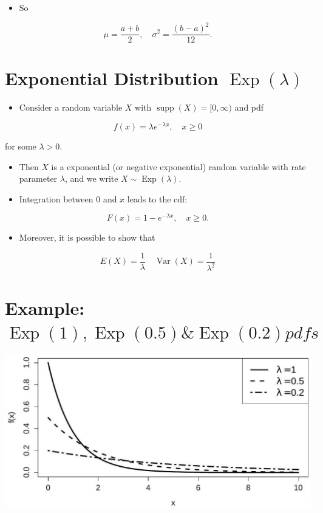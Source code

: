 \documentclass[10pt]{article}
\begin{document}
\begin{itemize}
  \item So
\end{itemize}

$$
\mu=\frac{a+b}{2}, \quad \sigma^{2}=\frac{(b-a)^{2}}{12} .
$$

\section*{Exponential Distribution $\operatorname{Exp}(\lambda)$}
\begin{itemize}
  \item Consider a random variable $X$ with $\operatorname{supp}(X)=[0, \infty)$ and pdf
\end{itemize}

$$
f(x)=\lambda e^{-\lambda x}, \quad x \geq 0
$$

for some $\lambda>0$.

\begin{itemize}
  \item Then $X$ is a exponential (or negative exponential) random variable with rate parameter $\lambda$, and we write $X \sim \operatorname{Exp}(\lambda)$.
  \item Integration between 0 and $x$ leads to the cdf:
\end{itemize}

$$
F(x)=1-e^{-\lambda x}, \quad x \geq 0 .
$$

\begin{itemize}
  \item Moreover, it is possible to show that
\end{itemize}

$$
E(X)=\frac{1}{\lambda} \quad \operatorname{Var}(X)=\frac{1}{\lambda^{2}}
$$

\section*{Example: $\operatorname{Exp}(1), \operatorname{Exp}(0.5) \& \operatorname{Exp}(0.2) p d f s$}
\begin{center}
\includegraphics[max width=\textwidth]{2025_05_11_1201cfe24e14b364b4ecg-23}
\end{center}
\end{document}
